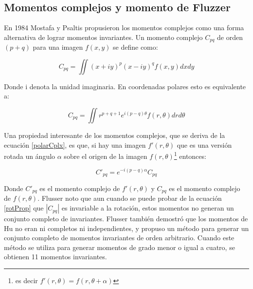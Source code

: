 \documentclass[a4paper, 11pt, oneside]{report}
\begin{document}
\subsection{Momentos complejos y momento de Fluzzer}

En 1984 Mostafa y Psaltis \cite{mostaf84} propusieron los momentos complejos como una forma alternativa de lograr momentos invariantes. Un momento complejo $C_{pq}$ de orden $(p+q)$ para una imagen $f(x,y)$ se define como:

	\[ C_{pq} = \iint{ (x+iy)^p (x-iy)^q f(x,y) dx dy } \]
	
Donde i denota la unidad imaginaria. En coordenadas polares esto es equivalente a:

	\begin{equation}\label{polarCplx}
		C_{pq} = \iint{ r^{p+q+1}e^{i(p-q)\theta}f(r,\theta) dr d\theta }
	\end{equation}

Una propiedad interesante de los momentos complejos, que se deriva de la ecuación \eqref{polarCplx}, es que, si hay una imagen $f'(r,\theta)$ que es una versión rotada un ángulo $\alpha$ sobre el origen de la imagen $f(r,\theta)$\footnote{es decir $f'(r,\theta) = f(r,\theta+\alpha)$} entonces:

\begin{equation}\label{rotProp}
	C'_{pq} = e^{-i(p-q)\alpha}C_{pq}
\end{equation}

Donde $C'_{pq}$ es el momento complejo de $f'(r,\theta)$ y $C_{pq}$ es el momento complejo de $f(r,\theta)$. Flusser noto \cite{flusser99} que aun cuando se puede probar de la ecuación \eqref{rotProp} que $|C_{pq}|$ es invariable a la rotación, estos momentos no generan un conjunto completo de invariantes. Flusser también demostró que los momentos de Hu no eran ni completos ni independientes, y propuso un método para generar un conjunto completo de momentos invariantes de orden arbitrario. Cuando este método se utiliza para generar momentos de grado menor o igual a cuatro, se obtienen 11 momentos invariantes.
\end{document}
